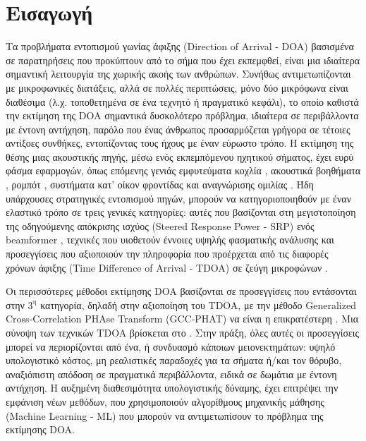 
\chapter{Εισαγωγή}


\noindent Τα προβλήματα εντοπισμού γωνίας άφιξης (Direction of Arrival - DOA) βασισμένα σε παρατηρήσεις που προκύπτουν από το σήμα που έχει εκπεμφθεί, είναι μια ιδιαίτερα σημαντική λειτουργία της χωρικής ακοής των ανθρώπων. Συνήθως αντιμετωπίζονται με μικροφωνικές διατάξεις, αλλά σε πολλές περιπτώσεις, μόνο δύο μικρόφωνα είναι διαθέσιμα (λ.χ. τοποθετημένα σε ένα τεχνητό ή πραγματικό κεφάλι), το οποίο καθιστά την εκτίμηση της DOA σημαντικά δυσκολότερο πρόβλημα, ιδιαίτερα σε περιβάλλοντα με έντονη αντήχηση, παρόλο που ένας άνθρωπος προσαρμόζεται γρήγορα σε τέτοιες αντίξοες συνθήκες, εντοπίζοντας τους ήχους με έναν εύρωστο τρόπο. Η εκτίμηση της θέσης μιας ακουστικής πηγής, μέσω ενός εκπεμπόμενου ηχητικού σήματος, έχει ευρύ φάσμα εφαρμογών, όπως επόμενης γενιάς εμφυτεύματα κοχλία \cite{Nicoletti2013, Aronoff2010}, ακουστικά βοηθήματα \cite{Grimaldi2019}, ρομπότ \cite{Tahmid2010}, συστήματα κατ' οίκον φροντίδας \cite{Chen2013} και αναγνώρισης ομιλίας \cite{Stern2012}. Ήδη υπάρχουσες στρατηγικές εντοπισμού πηγών, μπορούν να κατηγοριοποιηθούν με έναν ελαστικό τρόπο σε τρεις γενικές κατηγορίες: αυτές που βασίζονται στη μεγιστοποίηση της οδηγούμενης απόκρισης ισχύος (Steered Response Power - SRP) ενός beamformer \cite{Dibiase2001}, τεχνικές που υιοθετούν έννοιες υψηλής φασματικής ανάλυσης \cite{Johnson1993, Haykin1991} και προσεγγίσεις που αξιοποιούν την πληροφορία που προέρχεται από τις διαφορές χρόνων άφιξης (Time Difference of Arrival - TDOA) σε ζεύγη μικροφώνων \cite{Chen2006}. 

Οι περισσότερες μέθοδοι εκτίμησης DOA βασίζονται σε προσεγγίσεις που εντάσονται στην $ 3^\text{η} $ κατηγορία, δηλαδή στην αξιοποίηση του TDOA, με την μέθοδο Generalized Cross-Correlation PHAse Transform (GCC-PHAT) να είναι η επικρατέστερη \cite{Knapp1976}. Μια σύνοψη των τεχνικών TDOA βρίσκεται στο \cite{Chen2006}. Στην πράξη, όλες αυτές οι προσεγγίσεις μπορεί να περιορίζονται από ένα, ή συνδυασμό κάποιων μειονεκτημάτων: υψηλό υπολογιστικό κόστος, μη ρεαλιστικές παραδοχές για τα σήματα ή/και τον θόρυβο, αναξιόπιστη απόδοση σε πραγματικά περιβάλλοντα, ειδικά σε δωμάτια με έντονη αντήχηση. Η αυξημένη διαθεσιμότητα υπολογιστικής δύναμης, έχει επιτρέψει την εμφάνιση νέων μεθόδων, που χρησιμοποιούν αλγορίθμους μηχανικής μάθησης (Machine Learning - ML) που μπορούν να αντιμετωπίσουν το πρόβλημα της εκτίμησης DOA.

